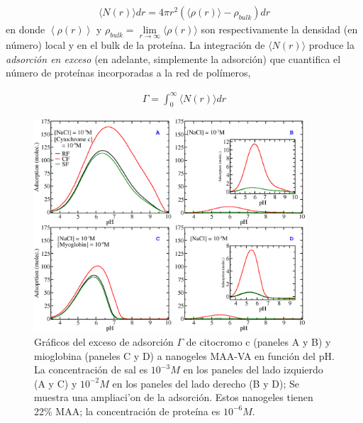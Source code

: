 \begin{align}
     \langle N(r)\rangle dr = 4\pi r^2 \left(\langle\rho(r)\rangle - \rho_{bulk}\right) dr
\end{align}
%
en donde $\left<\rho(r)\right>$ y $\rho_{bulk}=\lim\limits_{r\to \infty } \langle\rho(r)\rangle$ son respectivamente la densidad (en n\'umero) local y en el bulk de la prote\'ina.
La integraci\'on de $\langle N(r)\rangle$ produce la \emph{adsorci\'on en exceso} (en adelante, simplemente la adsorci\'on) que cuantifica el n\'umero de prote\'inas incorporadas a la red de pol\'imeros,


%
\begin{align}
    \Gamma =  \int_0^\infty{  \langle N(r)\rangle dr}
\end{align}
%



\begin{figure}[!htb]
\includegraphics[width=0.9\textwidth]{Figures/graphs-gel2/abcd.png}
\caption{Gr\'aficos del exceso de adsorci\'on $\Gamma$ de citocromo c (paneles A y B) y mioglobina (paneles C y D) a nanogeles MAA-VA en funci\'on del pH.
	La concentraci\'on de sal es $10^{-3}M$ en los paneles del lado izquierdo (A y C) y $10^{-2}M$ en los paneles del lado derecho
	(B y D); Se muestra una ampliaci'on de la adsorci\'on.
	Estos nanogeles tienen 22\% MAA; la concentraci\'on de prote\'ina es $10^{-6}M$.}
\label{fig:esf:adsorption-vs-pH-cyto-myo}
\end{figure}



